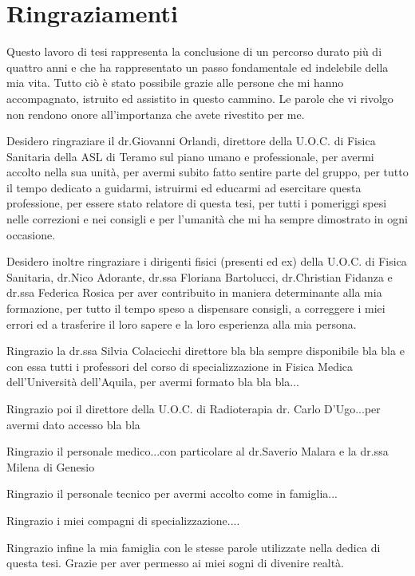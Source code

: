 \chapter*{Ringraziamenti}
Questo lavoro di tesi rappresenta la conclusione di un percorso durato più di quattro anni e che ha rappresentato un passo fondamentale ed indelebile della mia vita. Tutto ciò è stato possibile grazie alle persone che mi hanno accompagnato, istruito ed assistito in questo cammino. Le parole che vi rivolgo non rendono onore all'importanza che avete rivestito per me.

\vspace*{2ex}

Desidero ringraziare il dr.Giovanni Orlandi, direttore della U.O.C. di Fisica Sanitaria della ASL di Teramo sul piano umano e professionale, per avermi accolto nella sua unità, per avermi subito fatto sentire parte del gruppo, per tutto il tempo dedicato a guidarmi, istruirmi ed educarmi ad esercitare questa professione, per essere stato relatore di questa tesi, per tutti i pomeriggi spesi nelle correzioni e nei consigli e per l'umanità che mi ha sempre dimostrato in ogni occasione.

\vspace*{2ex}

Desidero inoltre ringraziare i dirigenti fisici (presenti ed ex) della U.O.C. di Fisica Sanitaria, dr.Nico Adorante, dr.ssa Floriana Bartolucci, dr.Christian Fidanza e dr.ssa Federica Rosica per aver contribuito in maniera determinante alla mia formazione, per tutto il tempo speso a dispensare consigli, a correggere i miei errori ed a trasferire il loro sapere e la loro esperienza alla mia persona.

\vspace*{2ex}

Ringrazio la dr.ssa Silvia Colacicchi direttore bla bla sempre disponibile bla bla e con essa tutti i professori del corso di specializzazione in Fisica Medica dell'Università dell'Aquila, per avermi formato bla bla bla...

\vspace*{2ex}

Ringrazio poi il direttore della U.O.C. di Radioterapia dr. Carlo D'Ugo...per avermi dato accesso bla bla

\vspace*{2ex}

Ringrazio il personale medico...con particolare al dr.Saverio Malara e la dr.ssa Milena di Genesio

\vspace*{2ex}

Ringrazio il personale tecnico per avermi accolto come in famiglia...

\vspace*{2ex}

Ringrazio i miei compagni di specializzazione....

\vspace*{2ex}

Ringrazio infine la mia famiglia con le stesse parole utilizzate nella dedica di questa tesi. Grazie per aver permesso ai miei sogni di divenire realtà.






 